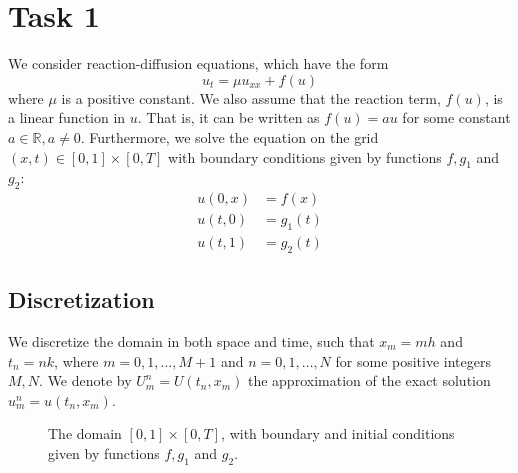 \section{Task 1}

We consider reaction-diffusion equations, which have the form
\begin{equation}
    \label{eq:original_eq}
     u_t = \mu u_{xx} + f(u)
\end{equation}
where $\mu$ is a positive constant.
We also assume that the reaction term,
$f(u)$, is a linear function in \( u \).
That is, it can be written as \( f(u) = au \)
for some constant \( a \in \mathbb{R}, a \neq 0 \).
Furthermore, we solve the equation on
the grid \( (x, t) \in [0, 1] \times [0, T] \)
with boundary conditions given by functions
\( f, g_1 \) and \( g_2 \):
\begin{align*}
  u(0, x) &= f(x) \\
  u(t, 0) &= g_1(t) \\
  u(t, 1) &= g_2(t)
\end{align*}

\subsection{Discretization}

We discretize the domain in both space and time,
such that $x_m = mh$ and $t_n = nk$,
where \( m = 0, 1, \dots, M + 1\) and \( n = 0, 1, \dots, N \)
for some positive integers \( M, N \).
We denote by \( U_m^n = U(t_n, x_m) \) the approximation
of the exact solution \( u_m^n = u(t_n, x_m) \).

\begin{figure}[!h]
  \centering
  \label{fig:disc}
  \caption{The domain \( [0, 1] \times [0, T] \),
    with boundary and initial conditions
    given by functions \( f, g_1 \) and \( g_2 \).
  }
\end{figure}

